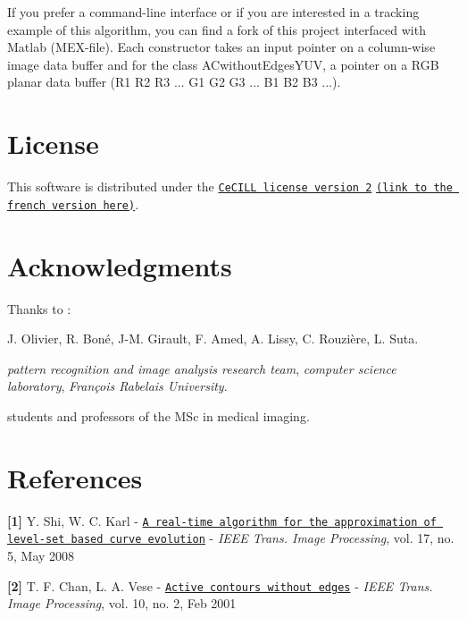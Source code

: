 If you prefer a command-\/line interface or if you are interested in a tracking example of this algorithm, you can find a fork of this project interfaced with Matlab (M\-E\-X-\/file). Each constructor takes an input pointer on a column-\/wise image data buffer and for the class A\-Cwithout\-Edges\-Y\-U\-V, a pointer on a R\-G\-B planar data buffer (R1 R2 R3 ... G1 G2 G3 ... B1 B2 B3 ...).\hypertarget{index_license_sec}{}\section{License}\label{index_license_sec}
This software is distributed under the \href{http://www.cecill.info/licences/Licence_CeCILL_V2-en.html}{\tt Ce\-C\-I\-L\-L license version 2} \href{http://www.cecill.info/licences/Licence_CeCILL_V2-fr.html}{\tt (link to the french version here)}.\hypertarget{index_acknowl_sec}{}\section{Acknowledgments}\label{index_acknowl_sec}
Thanks to \-:
\begin{DoxyItemize}
\item J. Olivier, R. Boné, J-\/\-M. Girault, F. Amed, A. Lissy, C. Rouzière, L. Suta.
\item {\itshape pattern recognition and image analysis research team}, {\itshape computer science laboratory}, {\itshape François Rabelais University}.
\item students and professors of the M\-Sc in medical imaging.
\end{DoxyItemize}



 \hypertarget{index_ref_sec}{}\section{References}\label{index_ref_sec}
{\bfseries \mbox{[}1\mbox{]}} Y. Shi, W. C. Karl -\/ \href{https://docs.google.com/viewer?a=v&pid=explorer&chrome=true&srcid=0Bzx5IoqehNE_MGIwYmUwYzctYTRkMC00ODMwLWI3YmUtNTFjYThlMTBkOTIy&hl=en&authkey=CPT1xeYN}{\tt A real-\/time algorithm for the approximation of level-\/set based curve evolution} -\/ {\itshape I\-E\-E\-E Trans. Image Processing}, vol. 17, no. 5, May 2008

{\bfseries \mbox{[}2\mbox{]}} T. F. Chan, L. A. Vese -\/ \href{https://docs.google.com/viewer?a=v&pid=explorer&chrome=true&srcid=0Bzx5IoqehNE_NWY5ZGMyMmYtNzkwNi00NjI0LWE4ZGMtODllZTVmZWQ5NGRm&hl=en&authkey=CNfMkNEI}{\tt Active contours without edges} -\/ {\itshape I\-E\-E\-E Trans. Image Processing}, vol. 10, no. 2, Feb 2001


